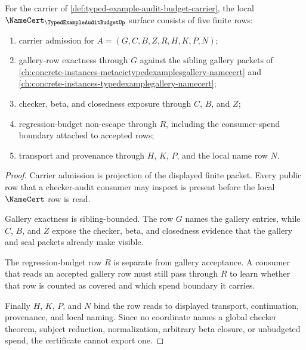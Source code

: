 \begin{theorem}
\label{thm:typed-example-audit-budget-namecert-obligations}
For the carrier of \autoref{def:typed-example-audit-budget-carrier}, the local $\NameCert_{\TypedExampleAuditBudgetUp}$ surface consists of five finite rows:
\begin{enumerate}
\item carrier admission for $A=(G,C,B,Z,R,H,K,P,N)$;
\item gallery-row exactness through $G$ against the sibling gallery packets of \autoref{ch:concrete-instances-metacictypedexamplesgallery-namecert} and \autoref{ch:concrete-instances-typedexamplegallery-namecert};
\item checker, beta, and closedness exposure through $C$, $B$, and $Z$;
\item regression-budget non-escape through $R$, including the consumer-spend boundary attached to accepted rows;
\item transport and provenance through $H$, $K$, $P$, and the local name row $N$.
\end{enumerate}
\end{theorem}
\begin{proof}
Carrier admission is projection of the displayed finite packet. Every public row that a checker-audit consumer may inspect is present before the local $\NameCert$ row is read.

Gallery exactness is sibling-bounded. The row $G$ names the gallery entries, while $C$, $B$, and $Z$ expose the checker, beta, and closedness evidence that the gallery and seal packets already make visible.

The regression-budget row $R$ is separate from gallery acceptance. A consumer that reads an accepted gallery row must still pass through $R$ to learn whether that row is counted as covered and which spend boundary it carries.

Finally $H$, $K$, $P$, and $N$ bind the row reads to displayed transport, continuation, provenance, and local naming. Since no coordinate names a global checker theorem, subject reduction, normalization, arbitrary beta closure, or unbudgeted spend, the certificate cannot export one.
\end{proof}

